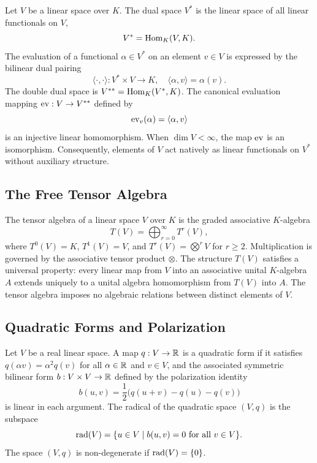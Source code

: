 \documentclass[11pt,a4paper]{article}
\begin{document}
Let $V$ be a linear space over $K$.
The dual space $V^*$ is the linear space of all linear functionals on $V$,
\begin{equation}
  V^* = \operatorname{Hom}_K(V, K).
\end{equation}
The evaluation of a functional $\alpha \in V^*$ on an element $v \in V$ is
expressed by the bilinear dual pairing
\begin{equation}
  \langle \cdot, \cdot \rangle : V^* \times V \to K, \quad
  \langle \alpha, v \rangle = \alpha(v).
\end{equation}
The double dual space is $V^{**} = \operatorname{Hom}_K(V^*, K)$.
The canonical evaluation mapping $\operatorname{ev} : V \to V^{**}$ defined by
\begin{equation}
  \operatorname{ev}_v(\alpha) = \langle \alpha, v \rangle
\end{equation}
is an injective linear homomorphism.
When $\dim V < \infty$, the map $\operatorname{ev}$ is an isomorphism.
Consequently, elements of $V$ act natively as linear functionals on $V^*$
without auxiliary structure.

\subsection{The Free Tensor Algebra}
\label{subsec:tensor_algebra}

The tensor algebra of a linear space $V$ over $K$ is the graded associative
$K$-algebra
\begin{equation}
  T(V) = \bigoplus_{r=0}^\infty T^r(V),
\end{equation}
where $T^0(V) = K$, $T^1(V) = V$, and $T^r(V) = \bigotimes^r V$ for $r \ge 2$.
Multiplication is governed by the associative tensor product $\otimes$.
The structure $T(V)$ satisfies a universal property: every linear map from $V$
into an associative unital $K$-algebra $A$ extends uniquely to a unital algebra
homomorphism from $T(V)$ into $A$.
The tensor algebra imposes no algebraic relations between distinct elements
of $V$.

\subsection{Quadratic Forms and Polarization}
\label{subsec:quadratic_forms}

Let $V$ be a real linear space.
A map $q : V \to \mathbb{R}$ is a quadratic form if it satisfies $q(\alpha v) = \alpha^2
q(v)$ for all $\alpha \in \mathbb{R}$ and $v \in V$, and the associated symmetric
bilinear form $b : V \times V \to \mathbb{R}$ defined by the polarization identity
\begin{equation}
  b(u, v) = \frac{1}{2} \bigl( q(u + v) - q(u) - q(v) \bigr)
\end{equation}
is linear in each argument.
The radical of the quadratic space $(V, q)$ is the subspace
\begin{equation}
  \operatorname{rad}(V) = \{ u \in V \mid b(u, v) = 0 \text{ for all } v \in V \}.
\end{equation}
The space $(V, q)$ is non-degenerate if $\operatorname{rad}(V) = \{0\}$.
\end{document}
